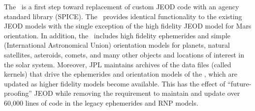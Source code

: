 The \SpiceDesc\ is a first step toward replacement of custom JEOD code with
an agency standard library (SPICE). The \SpiceDesc\ provides identical
functionality to the existing JEOD models with the single exception of the
high fidelity JEOD model for Mars orientation. In addition, the \SpiceDesc\
includes high fidelity ephemerides and simple (International Astronomical
Union) orientation models for planets, natural satellites, asteroids, comets,
and many other objects and locations of interest in the solar system. Moreover,
JPL maintains archives of the data files (called kernels) that drive the
ephemerides and orientation models of the \SpiceDesc, which are updated
as higher fidelity models become available. This has the effect of
``future-proofing'' JEOD while removing the requirement to maintain and update
over 60,000 lines of code in the legacy ephemerides and RNP models.
